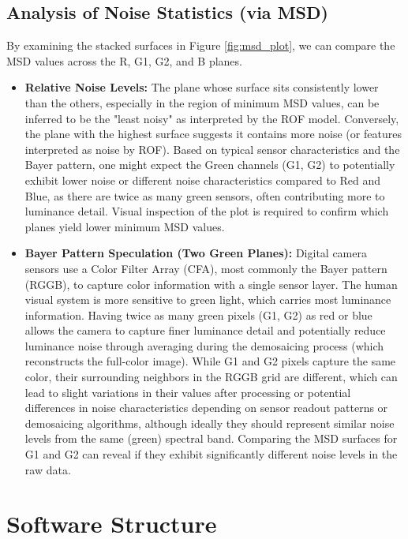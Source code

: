 \documentclass{article}
\begin{document}
	\subsection{Analysis of Noise Statistics (via MSD)}
	By examining the stacked surfaces in Figure \ref{fig:msd_plot}, we can compare the MSD values across the R, G1, G2, and B planes.
	\begin{itemize}
		\item \textbf{Relative Noise Levels:} The plane whose surface sits consistently lower than the others, especially in the region of minimum MSD values, can be inferred to be the "least noisy" as interpreted by the ROF model. Conversely, the plane with the highest surface suggests it contains more noise (or features interpreted as noise by ROF). Based on typical sensor characteristics and the Bayer pattern, one might expect the Green channels (G1, G2) to potentially exhibit lower noise or different noise characteristics compared to Red and Blue, as there are twice as many green sensors, often contributing more to luminance detail. Visual inspection of the plot is required to confirm which planes yield lower minimum MSD values.
		\item \textbf{Bayer Pattern Speculation (Two Green Planes):} Digital camera sensors use a Color Filter Array (CFA), most commonly the Bayer pattern (RGGB), to capture color information with a single sensor layer. The human visual system is more sensitive to green light, which carries most luminance information. Having twice as many green pixels (G1, G2) as red or blue allows the camera to capture finer luminance detail and potentially reduce luminance noise through averaging during the demosaicing process (which reconstructs the full-color image). While G1 and G2 pixels capture the same color, their surrounding neighbors in the RGGB grid are different, which can lead to slight variations in their values after processing or potential differences in noise characteristics depending on sensor readout patterns or demosaicing algorithms, although ideally they should represent similar noise levels from the same (green) spectral band. Comparing the MSD surfaces for G1 and G2 can reveal if they exhibit significantly different noise levels in the raw data.
	\end{itemize}
	
	\section{Software Structure}
	
\end{document}
